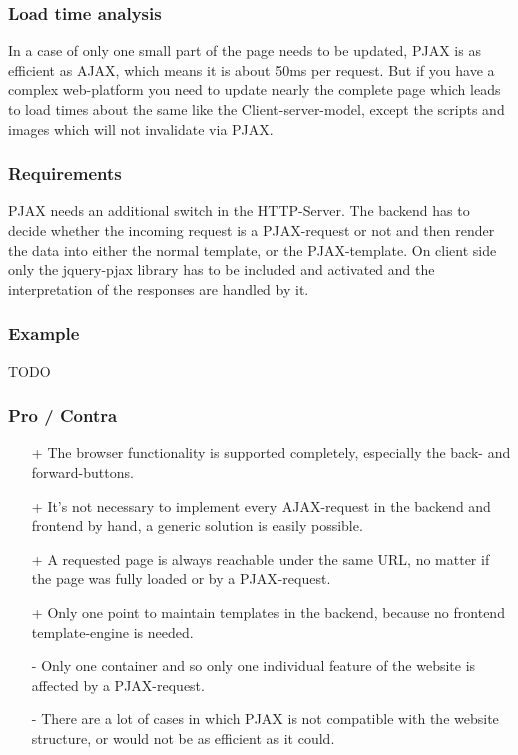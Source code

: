 \documentclass[f,bachelor,binding,twoside,palatino]{WeSTthesis}
\begin{document}
    \subsubsection{Load time analysis}
      In a case of only one small part of the page needs to be updated, \gls{PJAX} is as efficient as \gls{AJAX}, which means it is about 50ms per request.
      But if you have a complex web-platform you need to update nearly the complete page which leads to load times about the same like the Client-server-model, except the scripts and images which will not invalidate via \gls{PJAX}.
    
    \subsubsection{Requirements}
    \gls{PJAX} needs an additional switch in the HTTP-Server.
    The backend has to decide whether the incoming request is a \gls{PJAX}-request or not and then render the data into either the normal template, or the \gls{PJAX}-template.
    On client side only the jquery-pjax library has to be included and activated and the interpretation of the responses are handled by it.

    \subsubsection{Example}
    TODO

    \subsubsection{Pro / Contra}
      \begin{itemize}
  	    \item[+]{The browser functionality is supported completely, especially the back- and forward-buttons.}
  	    \item[+]{It's not necessary to implement every \gls{AJAX}-request in the backend and frontend by hand, a generic solution is easily possible.}
  	    \item[+]{A requested page is always reachable under the same URL, no matter if the page was fully loaded or by a \gls{PJAX}-request.}
  	    \item[+]{Only one point to maintain templates in the backend, because no frontend template-engine is needed.}
  	    \item[-]{Only one container and so only one individual feature of the website is affected by a \gls{PJAX}-request.}
  	    \item[-]{There are a lot of cases in which \gls{PJAX} is not compatible with the website structure, or would not be as efficient as it could.}
      \end{itemize}
\end{document}
